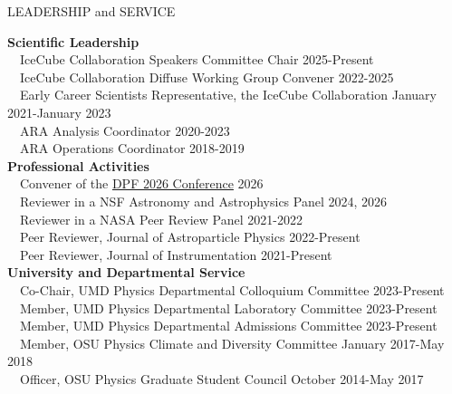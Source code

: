 \documentclass{resume} %
\begin{document}
\begin{rSection}{LEADERSHIP and SERVICE}

  \textbf{Scientific Leadership} \\
  \-\ \-\ IceCube Collaboration Speakers Committee Chair \hfill 2025-Present \\
  \-\ \-\ IceCube Collaboration Diffuse Working Group Convener \hfill 2022-2025 \\
  \-\ \-\ Early Career Scientists Representative, the IceCube Collaboration \hfill January 2021-January 2023 \\
  \-\ \-\ ARA Analysis Coordinator \hfill 2020-2023 \\
  \-\ \-\ ARA Operations Coordinator \hfill 2018-2019 \\

  \textbf{Professional Activities} \\
  \-\ \-\ Convener of the \href{https://indico.fnal.gov/event/72820/sessions/28477/#20260720}{DPF 2026 Conference} \hfill 2026 \\  
  \-\ \-\ Reviewer in a NSF Astronomy and Astrophysics Panel \hfill 2024, 2026 \\
  \-\ \-\ Reviewer in a NASA Peer Review Panel \hfill 2021-2022 \\
  \-\ \-\ Peer Reviewer, Journal of Astroparticle Physics \hfill 2022-Present \\
  \-\ \-\ Peer Reviewer, Journal of Instrumentation \hfill 2021-Present \\
  
  \textbf{University and Departmental Service} \\
  \-\ \-\ Co-Chair, UMD Physics Departmental Colloquium Committee \hfill 2023-Present \\
  \-\ \-\ Member, UMD Physics Departmental Laboratory Committee \hfill 2023-Present \\
  \-\ \-\ Member, UMD Physics Departmental Admissions Committee \hfill 2023-Present \\
  \-\ \-\ Member, OSU Physics Climate and Diversity Committee \hfill January 2017-May 2018\\
  \-\ \-\ Officer, OSU Physics Graduate Student Council \hfill October 2014-May 2017

\end{rSection}
\end{document}
